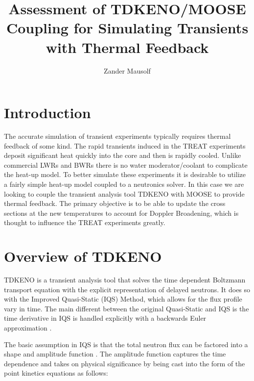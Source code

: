\documentclass[11pt]{article}
\begin{document}
%
\author{Zander Mausolf}
\title{Assessment of TDKENO/MOOSE Coupling for Simulating Transients with Thermal Feedback}
\maketitle

\section{Introduction}
The accurate simulation of transient experiments typically requires thermal feedback of some kind.  The rapid transients induced in the TREAT experiments deposit significant heat quickly into the core and then is rapidly cooled.  Unlike commercial LWRs and BWRs there is no water moderator/coolant to complicate the heat-up model.  To better simulate these experiments it is desirable to utilize a fairly simple heat-up model coupled to a neutronics solver.  In this case we are looking to couple the transient analysis tool TDKENO with MOOSE to provide thermal feedback.  The primary objective is to be able to update the cross sections at the new temperatures to account for Doppler Broadening, which is thought to influence the TREAT experiments greatly.  

\section{Overview of TDKENO}

TDKENO is a transient analysis tool that solves the time dependent Boltzmann transport equation with the explicit representation of delayed neutrons. It does so with the Improved Quasi-Static (IQS) Method, which allows for the flux profile vary in time.  The main different between the original Quasi-Static and IQS is the time derivative in IQS is handled explicitly with a backwards Euler approximation \cite{goluoglu2001time}. 

The basic assumption in IQS is that the total neutron flux can be factored into a shape and amplitude function \cite{Gehin}.  The amplitude function captures the time dependence and takes on physical significance by being cast into the form of the point kinetics equations as follows:
\end{document}
